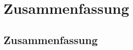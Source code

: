 \chapter{Zusammenfassung}
\label{chap:zusammenfassung}
\section{Zusammenfassung}
\label{sec:zusammenfassung}
